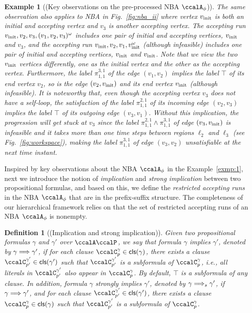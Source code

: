\documentclass[Afour,sageh,times]{sagej}
\newtheorem{exmp}{Example}
\newtheorem{defn}[thm]{Definition}
\newcommand{\clause}[1]{\mathsf{cls}(#1)}
\newcommand{\autop}{\ccalA_{\phi}}
\newcommand{\vertex}[1]{v_{\textup{#1}}}
\newcommand{\simplies}{\DOTSB\Longrightarrow}
\renewcommand{\ap}[3]{\mathcal{\pi}_{{#1},{#2}}^{#3}}
\newenvironment{cexmp}
{\addtocounter{exmp}{-1}\begin{exmp}}
  {\end{exmp}}
\begin{document}
\begin{cexmp}[(Key observations on the pre-processed NBA $\autop$)]
   The same observation also applies to NBA in Fig.~\ref{fig:nba_ii} where vertex $\vertex{init}$ is both an initial and accepting vertex and $v_3$ is another accepting vertex.  The accepting run $\vertex{init}, v_2, v_3, (v_1, v_2, v_3)^\omega$ includes one pair of initial and accepting vertices, $\vertex{init}$ and  $v_3$, and the accepting run $\vertex{init}, v_2, v_1, \vertex{init}^\omega$ (although infeasible) includes one pair of initial and accepting vertices, $\vertex{init}$ and $\vertex{init}$. Note that we view the two $\vertex{init}$ vertices differently, one as the initial vertex and the other as the accepting vertex. Furthermore, the label $\ap{1}{1}{3,1}$ of the edge $(v_1, v_2)$  implies the label $\top$ of its end vertex $v_2$, so is the edge $(v_2, \vertex{init})$ and its end vertex $\vertex{init}$ (although infeasible). It is noteworthy that, even though the accepting vertex $v_3$ does not have a self-loop, the satisfaction of the label $\ap{1}{1}{2,1}$ of its incoming edge $(v_2, v_3)$ implies the label $\top$ of its outgoing edge $(v_3, v_1)$. Without this implication, the progression will get stuck at $v_3$ since the label $\ap{1}{1}{2,1} \wedge \ap{1}{1}{3,1}$ of edge $(v_3, \vertex{init})$ is infeasible and it takes more than one time steps between regions $\ell_2$ and $\ell_3$ (see Fig.~\ref{fig:workspace}), making the label $\ap{1}{1}{3,1}$ of edge $(v_3, v_2)$ unsatisfiable at the next time instant.
 \end{cexmp}


 Inspired by key observations about the NBA $\autop$ in the Example~\ref{exmp:1}, next we introduce the notion of {\it implication} and {\it strong implication} between two propositional formulas, and based on this, we define the {\it restricted accepting runs} in the NBA $\autop$ that are in the prefix-suffix structure. The completeness of our hierarchical framework relies on that the set of restricted accepting runs of an NBA $\autop$ is nonempty.

 \begin{defn}[(Implication and strong implication)]\label{defn:implication}
   Given two propositional formulas $\gamma$ and $\gamma'$ over $\ccalA\ccalP$, we say that formula  $\gamma$ implies $\gamma'$, denoted by $\gamma \simplies \gamma'$, if for each clause $\ccalC_{p}^{\gamma} \in \clause{\gamma}$, there exists a clause $\ccalC_{p'}^{\gamma'} \in \clause{\gamma'}$ such that  $\ccalC_{p'}^{\gamma'}$ is a subformula of $\ccalC_{p}^{\gamma}$, i.e., all literals in $\ccalC_{p'}^{\gamma'}$ also appear in $\ccalC_{p}^{\gamma}$. By default, $\top$ is a subformula of any clause. In addition, formula $\gamma$ strongly implies $\gamma'$, denoted by $\gamma \simplies_s  \gamma'$, if $\gamma \simplies \gamma'$, and for each clause $\ccalC_{p'}^{\gamma'} \in \clause{\gamma'}$, there exists a clause $\ccalC_{p}^{\gamma} \in \clause{\gamma}$ such that  $\ccalC_{p'}^{\gamma'}$ is a subformula of $\ccalC_{p}^{\gamma}$.
 \end{defn}
\end{document}
